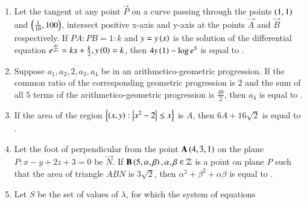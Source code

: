 \documentclass[journal]{IEEEtran}
\begin{document}
\begin{enumerate}[start = 16]
\begin{center}
	\end{center}
\item Let the tangent at any point $\vec{P}$ on a curve passing through the points $\left(1,1\right)$ and $\left(\frac{1}{10},100\right)$, intersect positive x-axis and y-axis at the points $\vec{A}$ and $\vec{B}$ respectively. If $PA : PB = 1 : k$ and $y=y\left(x\right)$ is the solution of the differential equation $e^{\frac{dy}{dx}} = kx + \frac{k}{2}, y\left(0\right) = k$, then $4y\left(1\right) -\log e^3$ is equal to \underline{\hspace{1 cm}}. 
\item Suppose $a_1, a_2, 2, a_3, a_4$ be in an arithmetico-geometric progression. If the common ratio of the corresponding geometric progression is $2$ and the sum of all $5$ terms of the arithmetico-geometric progression is $\frac{49}{2}$, then $a_4$ is equal to \underline{\hspace{1 cm}}. 
\item If the area of the region $\left\{\left(x,y\right) : \left\vert x^2-2\right\vert \le x\right\}$ is $A$, then $6A + 16\sqrt{2}$ is equal to \underline{\hspace{1 cm}}. 
\item Let the foot of perpendicular from the point $\mathbf{A} \left(4,3,1\right)$ on the plane $P : x - y + 2z +3 = 0$ be $\vec{N}$. If $\mathbf{B}\left(5,\alpha,\beta\right), \alpha, \beta \in \mathbb{Z}$ is a point on plane $P$ such that the area of triangle $ABN$ is $3\sqrt{2}$, then $\alpha^2 + \beta^2 +\alpha\beta $ is equal to \underline{\hspace{1 cm}}. 
\item Let $S$ be the set of values of $\lambda$, for which the system of equations 
\begin{align*}

\end{align*}
\end{enumerate}
\end{document}
